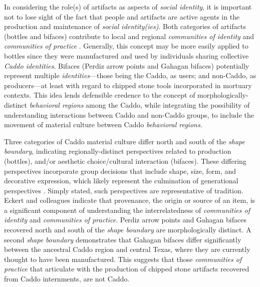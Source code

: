 \documentclass[smallextended]{svjour3}       %
\begin{document}
In considering the role(s) of artifacts as aspects of \emph{social
identity}, it is important not to lose sight of the fact that people and
artifacts are active agents in the production and maintenance of
\emph{social identity(ies)}. Both categories of artifacts (bottles and
bifaces) contribute to local and regional \emph{communities of identity}
and \emph{communities of practice} \cite{RN8061}. Generally, this
concept may be more easily applied to bottles since they were
manufactured and used by individuals sharing collective \emph{Caddo
identities}. Bifaces (Perdiz arrow points and Gahagan bifaces)
potentially represent multiple \emph{identities}---those being the
Caddo, as users; and non-Caddo, as producers---at least with regard to
chipped stone tools incorporated in mortuary contexts. This idea lends
defensible credence to the concept of morphologically-distinct
\emph{behavioral regions} among the Caddo, while integrating the
possibility of understanding interactions between Caddo and non-Caddo
groups, to include the movement of material culture between Caddo
\emph{behavioral regions}.

Three categories of Caddo material culture differ north and south of the
\emph{shape boundary}, indicating regionally-distinct perspectives
related to production (bottles), and/or aesthetic choice/cultural
interaction (bifaces). These differing perspectives incorporate group
decisions that include shape, size, form, and decorative expression,
which likely represent the culmination of generational perspectives
\cite{RN5610}. Simply stated, such perspectives are representative of
tradition. Eckert and colleagues \cite{RN8061} indicate that provenance,
the origin or source of an item, is a significant component of
understanding the interrelatedness of \emph{communities of identity} and
\emph{communities of practice}. Perdiz arrow points and Gahagan bifaces
recovered north and south of the \emph{shape boundary} are
morphologically distinct. A second \emph{shape boundary} demonstrates
that Gahagan bifaces differ significantly between the ancestral Caddo
region and central Texas, where they are currently thought to have been
manufactured. This suggests that those \emph{communities of practice}
that articulate with the production of chipped stone artifacts recovered
from Caddo internments, are not Caddo.
\end{document}
